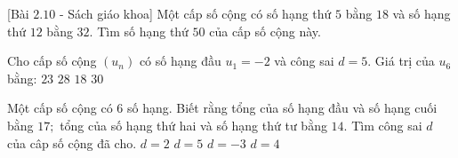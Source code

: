 \begin{bt}%
[Bài $2.10$ - Sách giáo khoa]%
	Một cấp số cộng có số hạng thứ $5$ bằng $18$ và số hạng thứ $12$ bằng $32$. Tìm số hạng thứ $50$ của cấp số cộng này.
\end{bt}

\begin{ex}%
	Cho cấp số cộng $(u_n)$ có số hạng đầu $u_1 = -2$ và công sai $d = 5$. Giá trị của $u_6$ bằng:
	\choice
	{\True $23$}
	{$28$}
	{$18$}
	{$30$}
\end{ex}

\begin{ex}%
	Một cấp số cộng có $6$ số hạng. Biết rằng tổng của số hạng đầu và số hạng cuối bằng $17;$ tổng của số hạng thứ hai và số hạng thứ  tư bằng $14$. Tìm công sai $d$ của câp số cộng đã cho.
	\choice 
		{ $d=2$ } 
		{ $d=5$ } 
		{ \True $d=-3$ } 
		 { $d=4$ }
\end{ex}
